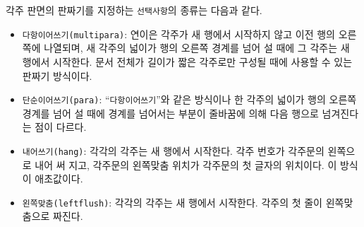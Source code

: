 각주 판면의 판짜기를 지정하는 \texttt{선택사항}의 종류는 다음과
같다.
\begin{itemize}

\item \texttt{다항이어쓰기(multipara)}: 연이은 각주가 새 행에서 시작하지 않고 이전
  행의 오른쪽에 나열되며, 새 각주의 넓이가 행의 오른쪽 경계를 넘어 설
  때에 그 각주는 새 행에서 시작한다.  문서 전체가 길이가 짧은 각주로만
  구성될 때에 사용할 수 있는 판짜기 방식이다.


\item \texttt{단순이어쓰기(para)}: ``\texttt{다항이어쓰기}''와 같은 방식이나
  한 각주의 넓이가 행의 오른쪽 경계를 넘어 설 때에 경계를 넘어서는
  부분이 줄바꿈에 의해 다음 행으로 넘겨진다는 점이 다르다.


\item \texttt{내어쓰기(hang)}: 각각의 각주는 새 행에서 시작한다.  각주 번호가
  각주문의 왼쪽으로 내어 써 지고, 각주문의 왼쪽맞춤 위치가 각주문의 첫
  글자의 위치이다.  이 방식이 애초값이다.


\item \texttt{왼쪽맞춤(leftflush)}: 각각의 각주는 새 행에서 시작한다.  각주의 첫
  줄이 왼쪽맞춤으로 짜진다.



\end{itemize}
